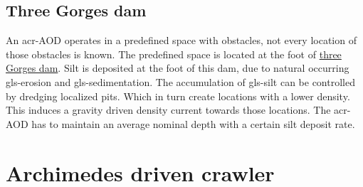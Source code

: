 \subsection{Three Gorges dam}\label{sec:usecase3}
An \gls{acr-AOD} operates in a predefined space with obstacles, not every location of those obstacles is known. The predefined space is located at the foot of \href{https://www.google.nl/maps/place/Three+Gorges+Dam/@30.8263416,111.0118356,16z/data=!4m2!3m1!1s0x368476d5e9a340d9:0xa017b4d524bd9d6c}{three Gorges dam}. Silt is deposited at the foot of this dam, due to natural occurring \gls{gls-erosion} and \gls{gls-sedimentation}. The accumulation of \gls{gls-silt} can be controlled by dredging localized pits. Which in turn create locations with a lower density. This induces a gravity driven density current towards those locations. The \gls{acr-AOD} has to maintain an average nominal depth with a certain silt deposit rate.

\section{Archimedes driven crawler}
